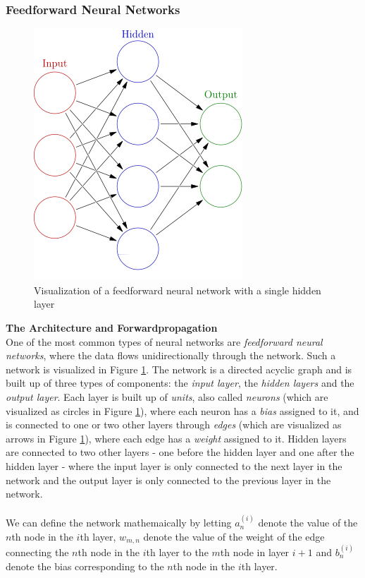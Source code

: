 \documentclass[./main.tex]{subfiles}
\begin{document}
\subsubsection{Feedforward Neural Networks} \label{subsubsec:FeedforwardNN}
\begin{figure}[htbp]
    \centering
    \includegraphics[height = 5 cm]{entities/feed_forward_nn.jpg}
    \caption{Visualization of a feedforward neural network with a single hidden layer \cite{feedforward_nn}}
    \label{feedforward_nn}
\end{figure}
\noindent \textbf{The Architecture and Forwardpropagation} \\
One of the most common types of neural networks are \textit{feedforward neural networks}, where the data flows unidirectionally through the network. Such a network is visualized in Figure \ref{feedforward_nn}. The network is a directed acyclic graph and is built up of three types of components: the \textit{input layer}, the \textit{hidden layers} and the \textit{output layer}. Each layer is built up of \textit{units}, also called \textit{neurons} (which are visualized as circles in Figure \ref{feedforward_nn}), where each neuron has a \textit{bias} assigned to it, and is connected to one or two other layers through \textit{edges} (which are visualized as arrows in Figure \ref{feedforward_nn}), where each edge has a \textit{weight} assigned to it. Hidden layers are connected to two other layers - one before the hidden layer and one after the hidden layer - where the input layer is only connected to the next layer in the network and the output layer is only connected to the previous layer in the network. 
\\
\\
We can define the network mathemaically by letting $a_n ^{(i)}$ denote the value of the $n$th node in the $i$th layer, $w_{m, n}$ denote the value of the weight of the edge connecting the $n$th node in the $i$th layer to the $m$th node in layer $i + 1$ and $b_n ^{(i)}$ denote the bias corresponding to the $n$th node in the $i$th layer. \\
\end{document}
